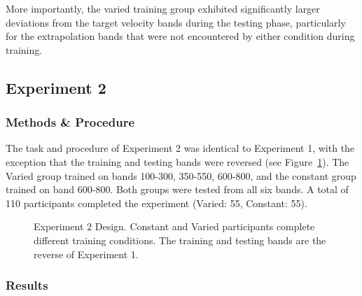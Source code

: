 \documentclass[
  12pt,
  letterpaper,
]{article}
\begin{document}
More importantly, the varied training group exhibited significantly
larger deviations from the target velocity bands during the testing
phase, particularly for the extrapolation bands that were not
encountered by either condition during training.

\subsection{Experiment 2}\label{experiment-2-1}

\subsubsection{Methods \& Procedure}\label{methods-procedure}

The task and procedure of Experiment 2 was identical to Experiment 1,
with the exception that the training and testing bands were reversed
(see Figure~\ref{fig-design-e2}). The Varied group trained on bands
100-300, 350-550, 600-800, and the constant group trained on band
600-800. Both groups were tested from all six bands. A total of 110
participants completed the experiment (Varied: 55, Constant: 55).

\begin{figure}


\caption{\label{fig-design-e2}Experiment 2 Design. Constant and Varied
participants complete different training conditions. The training and
testing bands are the reverse of Experiment 1.}

\end{figure}%

\subsubsection{Results}\label{results-3}
\end{document}
